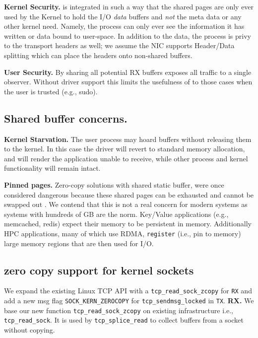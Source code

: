 \noindent\textbf{Kernel Security.} \oursys is integrated in such a way that the shared pages are only ever used by the Kernel to hold the I/O \emph{data} buffers and \emph{not} the meta data or any other kernel need. Namely, the process can only ever see the information it has written or data bound to user-space. In addition to the data, the process is privy to the transport headers as well; we assume the NIC supports Header/Data splitting\cite{hds} which can place the headers onto non-shared buffers.

\noindent\textbf{User Security.} By sharing all potential RX buffers \oursys exposes all traffic to a single observer.
Without driver support this limits the usefulness of \oursys to those cases when the user is trusted (e.g., sudo). 

\subsection{Shared buffer concerns.}
\noindent\textbf{Kernel Starvation.} The user process may hoard \oursys buffers without releasing them to the kernel.
In this case the driver will revert to standard memory allocation, and will render the application unable to receive, while other process and kernel functionality will remain intact.


\noindent\textbf{Pinned pages.} Zero-copy solutions with shared static buffer, were once considered dangerous because these shared pages can be exhausted and cannot be swapped out \cite{song2012performance,yamagiwa2005active}. We contend that this is not a real concern for modern systems as systems with hundreds of GB are the norm. Key/Value applications (e.g., memcached, redis) expect their memory to be persistent in memory. Additionally HPC applications, many\cite{top500} of which use RDMA, \texttt{register} (i.e., pin to memory) large memory regions that are then used for I/O.

\subsection{zero copy support for kernel sockets}
We expand the existing Linux TCP API with a \texttt{tcp\_read\_sock\_zcopy} for \texttt{RX} and add a new msg flag \texttt{SOCK\_KERN\_ZEROCOPY} for \texttt{tcp\_sendmsg\_locked} in \texttt{TX}. 
\noindent \textbf{RX.} We base our new function \texttt{tcp\_read\_sock\_zcopy} on existing infrastructure i.e., \texttt{tcp\_read\_sock}. It is used by \texttt{tcp\_splice\_read} to collect buffers from a socket without copying.

